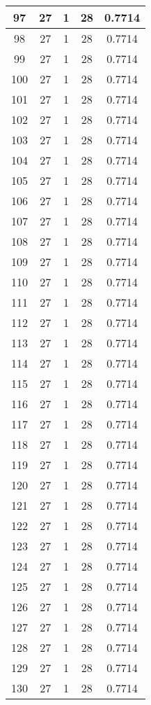 \documentclass[letterpaper, 12pt]{article}
\begin{document}
\begin{longtable}{|c|c|c|c|c|}
\hline
97 & 27 & 1 & 28 & 0.7714 \\
\hline
98 & 27 & 1 & 28 & 0.7714 \\
\hline
99 & 27 & 1 & 28 & 0.7714 \\
\hline
100 & 27 & 1 & 28 & 0.7714 \\
\hline
101 & 27 & 1 & 28 & 0.7714 \\
\hline
102 & 27 & 1 & 28 & 0.7714 \\
\hline
103 & 27 & 1 & 28 & 0.7714 \\
\hline
104 & 27 & 1 & 28 & 0.7714 \\
\hline
105 & 27 & 1 & 28 & 0.7714 \\
\hline
106 & 27 & 1 & 28 & 0.7714 \\
\hline
107 & 27 & 1 & 28 & 0.7714 \\
\hline
108 & 27 & 1 & 28 & 0.7714 \\
\hline
109 & 27 & 1 & 28 & 0.7714 \\
\hline
110 & 27 & 1 & 28 & 0.7714 \\
\hline
111 & 27 & 1 & 28 & 0.7714 \\
\hline
112 & 27 & 1 & 28 & 0.7714 \\
\hline
113 & 27 & 1 & 28 & 0.7714 \\
\hline
114 & 27 & 1 & 28 & 0.7714 \\
\hline
115 & 27 & 1 & 28 & 0.7714 \\
\hline
116 & 27 & 1 & 28 & 0.7714 \\
\hline
117 & 27 & 1 & 28 & 0.7714 \\
\hline
118 & 27 & 1 & 28 & 0.7714 \\
\hline
119 & 27 & 1 & 28 & 0.7714 \\
\hline
120 & 27 & 1 & 28 & 0.7714 \\
\hline
121 & 27 & 1 & 28 & 0.7714 \\
\hline
122 & 27 & 1 & 28 & 0.7714 \\
\hline
123 & 27 & 1 & 28 & 0.7714 \\
\hline
124 & 27 & 1 & 28 & 0.7714 \\
\hline
125 & 27 & 1 & 28 & 0.7714 \\
\hline
126 & 27 & 1 & 28 & 0.7714 \\
\hline
127 & 27 & 1 & 28 & 0.7714 \\
\hline
128 & 27 & 1 & 28 & 0.7714 \\
\hline
129 & 27 & 1 & 28 & 0.7714 \\
\hline
130 & 27 & 1 & 28 & 0.7714 \\

\end{longtable}
\end{document}
